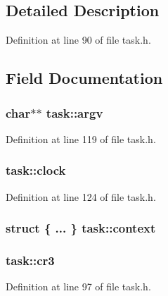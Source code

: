 \subsection{Detailed Description}


Definition at line 90 of file task.\+h.



\subsection{Field Documentation}
\hypertarget{structtask_a91e7540d20695c7439f7d0755a7a0545}{
\subsubsection[{argv}]{\setlength{\rightskip}{0pt plus 5cm}char$\ast$$\ast$ task\+::argv}}\label{structtask_a91e7540d20695c7439f7d0755a7a0545}


Definition at line 119 of file task.\+h.

\hypertarget{structtask_a8a31c6648c1b1869bfa069f4a969b0ad}{
\subsubsection[{clock}]{ task\+::clock}}\label{structtask_a8a31c6648c1b1869bfa069f4a969b0ad}


Definition at line 124 of file task.\+h.

\hypertarget{structtask_a7e47fc3627188eeefc77f78e8d36ddd1}{
\subsubsection[{context}]{\setlength{\rightskip}{0pt plus 5cm}struct \{ ... \}   task\+::context}}\label{structtask_a7e47fc3627188eeefc77f78e8d36ddd1}
\hypertarget{structtask_a5f4968459d4640f19c7e802ae7057179}{
\subsubsection[{cr3}]{ task\+::cr3}}\label{structtask_a5f4968459d4640f19c7e802ae7057179}


Definition at line 97 of file task.\+h.

